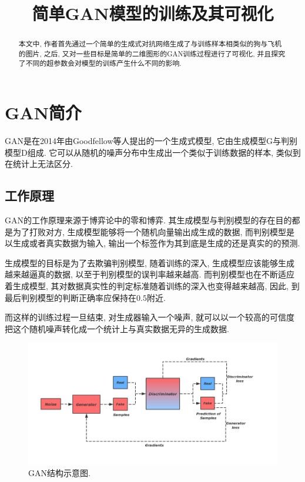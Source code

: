 \documentclass[lang=cn,11pt]{elegantpaper}
\title{简单GAN模型的训练及其可视化}
\date{}
\begin{document}

\newpage
\maketitle
{}

\begin{abstract}
本文中, 作者首先通过一个简单的生成式对抗网络生成了与训练样本相类似的狗与飞机的图片, 之后, 又对一些目标是简单的二维图形的GAN训练过程进行了可视化, 并且探究了不同的超参数会对模型的训练产生什么不同的影响. 
\end{abstract}
\tableofcontents
\newpage
{}
\section{GAN简介}

GAN是在2014年由Goodfellow等人提出的一个生成式模型, 它由生成模型G与判别模型D组成. 它可以从随机的噪声分布中生成出一个类似于训练数据的样本, 类似到在统计上无法区分. 

\subsection{工作原理}

GAN的工作原理来源于博弈论中的零和博弈. 其生成模型与判别模型的存在目的都是为了打败对方, 生成模型能够将一个随机向量输出成生成的数据, 而判别模型是以生成或者真实数据为输入, 输出一个标签作为其到底是生成的还是真实的的预测.

生成模型的目标是为了去欺骗判别模型, 随着训练的深入, 生成模型应该能够生成越来越逼真的数据, 以至于判别模型的误判率越来越高. 而判别模型也在不断适应着生成模型, 其对数据真实性的判定标准随着训练的深入也变得越来越高, 因此, 到最后判别模型的判断正确率应保持在$0.5$附近. 

而这样的训练过程一旦结束, 对生成器输入一个噪声, 就可以以一个较高的可信度把这个随机噪声转化成一个统计上与真实数据无异的生成数据. 

\begin{figure}[hb]
    \centering
    \includegraphics[width=.8\textwidth]{DCGAN}
    \caption{GAN结构示意图. }
\end{figure}
\end{document}
